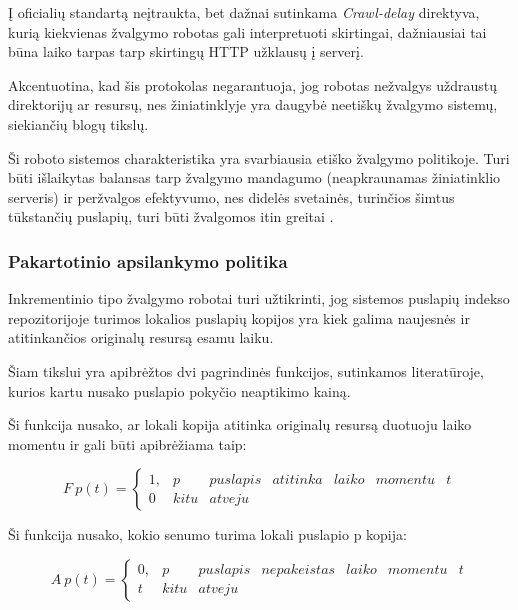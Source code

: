 Į oficialių standartą neįtraukta, bet dažnai sutinkama \textit{Crawl-delay} direktyva, kurią kiekvienas žvalgymo robotas gali interpretuoti skirtingai, dažniausiai tai būna laiko tarpas tarp skirtingų HTTP užklausų į serverį.

Akcentuotina, kad šis protokolas negarantuoja, jog robotas nežvalgys uždraustų direktorijų ar resursų, nes žiniatinklyje yra daugybė neetiškų žvalgymo sistemų, siekiančių blogų tikslų.


Ši roboto sistemos charakteristika yra svarbiausia etiško žvalgymo politikoje. Turi būti išlaikytas balansas tarp žvalgymo mandagumo (neapkraunamas žiniatinklio serveris) ir peržvalgos efektyvumo, nes didelės svetainės, turinčios šimtus tūkstančių puslapių, turi būti žvalgomos itin greitai \cite{EffectiveWebCrawling}.

\subsubsection{Pakartotinio apsilankymo politika}

Inkrementinio tipo žvalgymo robotai turi užtikrinti, jog sistemos puslapių indekso repozitorijoje turimos lokalios puslapių kopijos yra kiek galima naujesnės ir atitinkančios originalų resursą esamu laiku. \cite{EffectiveWebCrawling}

Šiam tikslui yra apibrėžtos dvi pagrindinės funkcijos, sutinkamos literatūroje, kurios kartu nusako puslapio pokyčio neaptikimo kainą.


Ši funkcija nusako, ar lokali kopija atitinka originalų resursą duotuoju laiko momentu ir gali būti apibrėžiama taip:

\[F\: p(t) = \left\{\begin{matrix} 1, & p & puslapis & atitinka & laiko & momentu & t\\ 0 & kitu & atveju \end{matrix}\right.\]


Ši funkcija nusako, kokio senumo turima lokali puslapio p kopija:

\[A\: p(t) = \left\{\begin{matrix} 0, & p & puslapis & nepakeistas & laiko & momentu & t\\ t & kitu & atveju \end{matrix}\right.\]

